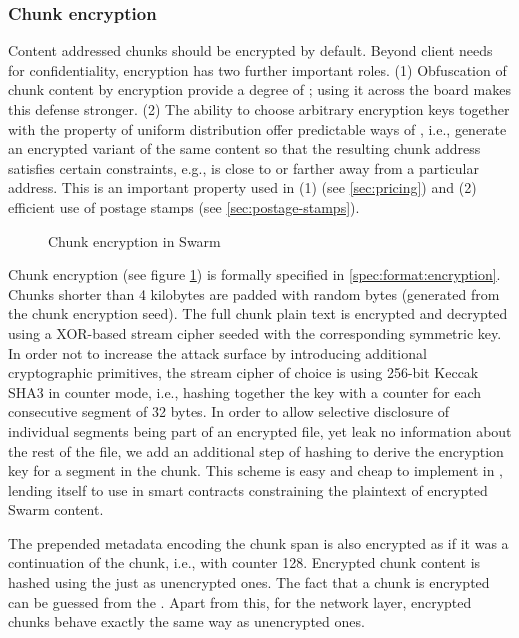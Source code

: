 \subsubsection{Chunk encryption}\label{sec:chunk-encryption}

Content addressed chunks should be encrypted by default. Beyond client needs for confidentiality, encryption has two further important roles. (1) Obfuscation of chunk content by encryption provide a degree of ; using it across the board makes this defense stronger. (2) The ability to choose arbitrary encryption keys together with the property of uniform distribution offer predictable ways of , i.e., generate an encrypted variant of the same content so that the resulting chunk address satisfies certain constraints, e.g., is close to or farther away from a particular address. This is an important property used in (1)  (see \ref{sec:pricing}) and (2) efficient use of postage stamps (see \ref{sec:postage-stamps}).


\begin{figure}[htbp]
   \centering
   \caption[Chunk encryption in Swarm]{Chunk encryption in Swarm}
   \label{fig:chunk-encryption}
\end{figure}


Chunk encryption (see figure \ref{fig:chunk-encryption}) is formally specified in \ref{spec:format:encryption}. Chunks shorter than 4 kilobytes are padded with random bytes (generated from the chunk encryption seed). The full chunk plain text is encrypted and decrypted using a XOR-based stream cipher seeded with the corresponding symmetric key. In order not to increase the attack surface by introducing additional cryptographic primitives, the stream cipher of choice is using 256-bit Keccak SHA3 in counter mode, i.e., hashing together the key with a counter for each consecutive segment of 32 bytes. In order to allow selective disclosure of individual segments being part of an encrypted file, yet leak no information about the rest of the file, we add an additional step of hashing to  derive the encryption key for a segment in the chunk. This scheme is easy and cheap to implement in , lending itself to use in smart contracts constraining the plaintext of encrypted Swarm content. 

The prepended metadata encoding the chunk span is also encrypted as if it was a continuation of the chunk, i.e., with counter 128. Encrypted chunk content is hashed using the  just as unencrypted ones. The fact that a chunk is encrypted can be guessed from the . Apart from this, for the network layer, encrypted chunks behave exactly the same way as unencrypted ones.

